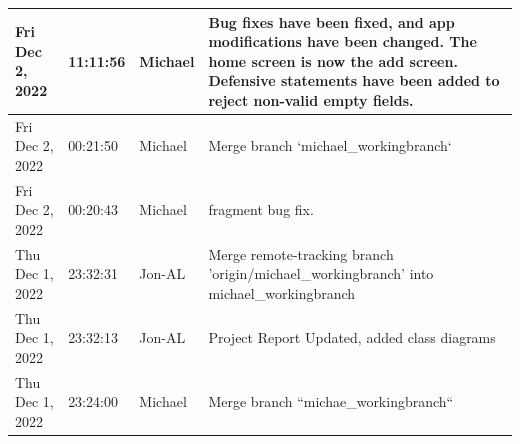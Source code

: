 \documentclass[11pt]{article}
\begin{document}
\begin{center}
\begin{longtable}{|p{2.7cm}|l|p{2cm}|p{8cm}|}
           \hline Fri Dec 2, 2022                            & 11:11:56                           & Michael                                 & Bug fixes have been fixed, and app modifications have been changed. The home screen is now the add screen. Defensive statements have been added to reject non-valid empty fields.                                                                                                                          \\
           \hline Fri Dec 2, 2022                            & 00:21:50                           & Michael                                 & Merge branch `michael\_workingbranch`                                                                                                                                                                                                                                                                       \\
           \hline Fri Dec 2, 2022                            & 00:20:43                           & Michael                                 & fragment bug fix.                                                                                                                                                                                                                                                                                          \\
           \hline Thu Dec 1, 2022                            & 23:32:31                           & Jon-AL                                  & Merge remote-tracking branch 'origin/michael\_workingbranch' into michael\_workingbranch                                                                                                                                                                                                                     \\
           \hline Thu Dec 1, 2022                            & 23:32:13                           & Jon-AL                                  & Project Report Updated, added class diagrams                                                                                                                                                                                                                                                               \\
           \hline Thu Dec 1, 2022                            & 23:24:00                           & Michael                                 & Merge branch ``michae\_workingbranch``                                                                                                                                                                                                                                                                       \\

\end{longtable}
\end{center}
\end{document}
